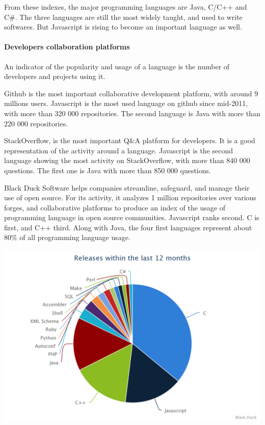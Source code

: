 From these indexes, the major programming languages are Java, C/C++ and C\#.
The three languages are still the most widely taught, and used to write softwares.
But Javascript is rising to become an important language as well.

\paragraph{Developers collaboration platforms}

An indicator of the popularity and usage of a language is the number of developers and projects using it.

Github is the most important collaborative development platform, with around 9 millions users.
Javascript is the most used language on github since mid-2011, with more than 320 000 repositories.
The second language is Java with more than 220 000 repositories.


StackOverflow, is the most important Q\&A platform for developers.
It is a good representation of the activity around a language.
Javascript is the second language showing the most activity on StackOverflow, with more than 840 000 questions.
The first one is Java with more than 850 000 questions.

Black Duck Software helps companies streamline, safeguard, and manage their use of open source.
For its activity, it analyzes 1 million repositories over various forges, and collaborative platforms to produce an index of the usage of programming language in open source communities.
Javascript ranks second.
C is first, and C++ third.
Along with Java, the four first languages represent about 80\% of all programming language usage.

\includegraphics[width=0.9\linewidth]{../../data/js-trends/black-duck-15}

